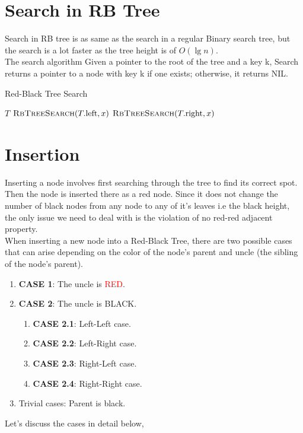 \documentclass{article}
\begin{document}
\section{Search in RB Tree}
Search in RB tree is as same as the search in a regular Binary search tree, but the search is a lot faster as the tree height is of $O(\lg n)$.
\\
The search algorithm Given a pointer to the root of the tree and a key k, Search
returns a pointer to a node with key k if one exists; otherwise, it returns NIL.
\begin{algorithm}
\caption{Red-Black Tree Search}
\begin{algorithmic}[1]
        \State \Return $T$
        \State \Return $\textsc{RbTreeSearch}(T.\text{left}, x)$
    \Else
        \State \Return $\textsc{RbTreeSearch}(T.\text{right}, x)$
    \EndIf
\EndProcedure
\end{algorithmic}
\end{algorithm}

\section{Insertion}
Inserting a node involves first searching through the tree to find its correct spot. Then the node is inserted there as a red node. Since it does not change the number of black nodes from any node to any of it’s leaves i.e the black height, the only issue we need to deal with is the violation of no red-red adjacent property.
\\
When inserting a new node into a Red-Black Tree, there are two possible cases that can arise depending on the color of the node's parent and uncle (the sibling of the node's parent).
\begin{enumerate}
    \item \textbf{CASE 1}: The uncle is \textcolor{red}{RED}.
    \item \textbf{CASE 2}: The uncle is BLACK.
        \begin{enumerate}
            \item \textbf{CASE 2.1}: Left-Left case.
            \item \textbf{CASE 2.2}: Left-Right case.
            \item \textbf{CASE 2.3}: Right-Left case.
            \item \textbf{CASE 2.4}: Right-Right case.
        \end{enumerate}
    \item Trivial cases: Parent is black.
\end{enumerate}
Let's discuss the cases in detail below,
\end{document}
